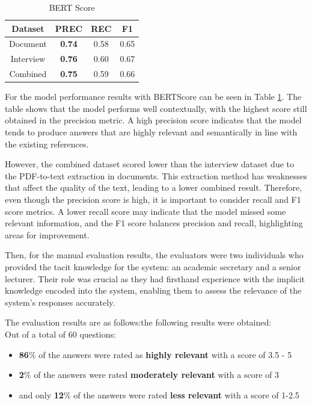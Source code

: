 \documentclass[runningheads]{llncs}
\begin{document}
\begin{table}[htbp]
    \centering
    \caption{BERT Score}
    \setlength{\arrayrulewidth}{0.5pt} %
    \renewcommand{\arraystretch}{1.5} %
    \begin{tabular}{|c|c|c|c|}
        \cline{2-4}
        \hline
        \textbf{Dataset} & \textbf{PREC} & \textbf{REC} & \textbf{F1}  \\
        \hline
        Document & \textbf{0.74} & 0.58 & 0.65 \\ 
        \hline
        Interview & \textbf{0.76} & 0.60 & 0.67 \\ 
        \hline
        Combined & \textbf{0.75} & 0.59 & 0.66 \\ 
        \hline
    \end{tabular}
    \label{tab:bert-table}
\end{table}

For the model performance results with BERTScore can be seen in Table \ref{tab:bert-table}. The table shows that the model performs well contextually, with the highest score still obtained in the precision metric. A high precision score indicates that the model tends to produce answers that are highly relevant and semantically in line with the existing references.

However, the combined dataset scored lower than the interview dataset due to the PDF-to-text extraction in documents. This extraction method has weaknesses that affect the quality of the text, leading to a lower combined result. Therefore, even though the precision score is high, it is important to consider recall and F1 score metrics. A lower recall score may indicate that the model missed some relevant information, and the F1 score balances precision and recall, highlighting areas for improvement.

Then, for the manual evaluation results, the evaluators were two individuals who provided the tacit knowledge for the system: an academic secretary and a senior lecturer. Their role was crucial as they had firsthand experience with the implicit knowledge encoded into the system, enabling them to assess the relevance of the system's responses accurately.

The evaluation results are as follows:the following results were obtained: \\
Out of a total of 60 questions:
\begin{itemize}
    \item \textbf{86}\% of the answers were rated as \textbf{highly relevant} with a score of 3.5 - 5
    \item \textbf{2}\% of the answers were rated \textbf{moderately relevant} with a score of 3
    \item and only \textbf{12}\% of the answers were rated \textbf{less relevant} with a score of 1-2.5
\end{itemize}
\end{document}
